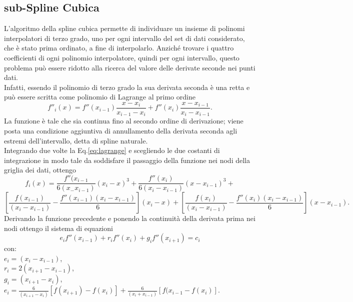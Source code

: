 \documentclass{article}
\numberwithin{equation}{subsection}
\begin{document}
\subsection{sub-Spline Cubica}
\vspace{0.2 cm}
L'algoritmo della spline cubica permette di individuare un insieme di polinomi interpolatori di terzo grado, uno per ogni intervallo del set di dati considerato, che è stato prima ordinato, a fine di interpolarlo. Anziché trovare i quattro coefficienti di ogni polinomio interpolatore, quindi per ogni intervallo, questo problema può essere ridotto alla ricerca del valore delle derivate seconde nei punti dati. \\
Infatti, essendo il polinomio di terzo grado la sua derivata seconda è una retta e può essere scritta come polinomio di Lagrange al primo ordine
\begin{equation} \label{eq:lagrange}
    f''_i(x)=f''(x_{i-1})\frac{x-x_i}{x_{i-1}-x_i}+f''(x_i)\frac{x-x_{i-1}}{x_i-x_{i-1}}.
\end{equation}
La funzione è tale che sia continua fino al secondo ordine di derivazione; viene posta una condizione aggiuntiva di annullamento della derivata seconda agli estremi dell'intervallo, detta di spline naturale.\\
Integrando due volte la Eq.\ref{eq:lagrange} e scegliendo le due costanti di integrazione in modo tale da soddisfare il passaggio della funzione nei nodi della griglia dei dati, ottengo 
\newpage
$$f_i(x)=\frac{f''(x_{i-1}}{6(x_-x_{i-1})}(x_i-x)^3+\frac{f''(x_i)}{6(x_i-x_{i-1})}(x-x_{i-1})^3+$$
\begin{equation}\label{eq:interpolazione}
    [\frac{f(x_{i-1})}{(x_i-x_{i-1})}-\frac{f''(x_{i-1})(x_i-x_{i-1})}{6}](x_i-x)+[\frac{f(x_i)}{(x_i-x_{i-1})}-\frac{f''(x_i)(x_i-x_{i-1})}{6}](x-x_{i-1}). 
\end{equation}
Derivando la funzione precedente e ponendo la continuità della derivata prima nei nodi ottengo il sistema di equazioni
\begin{equation} \label{eq:spline}
    e_if''(x_{i-1})+r_if''(x_i)+g_if''(x_{i+1})=c_i
\end{equation}
con:\\
$e_i=(x_i-x_{i-1})$,\\
$r_i=2(x_{i+1}-x_{i-1})$,\\
$g_i=(x_{i+1}-x_i)$,\\
$e_i=\frac{6}{(x_{i+1}-x_i)}[f(x_{i+1})-f(x_i)]+\frac{6}{(x_i+x_{i-1})}[f(x_{i-1}-f(x_i)]$.\\
\\
\end{document}
